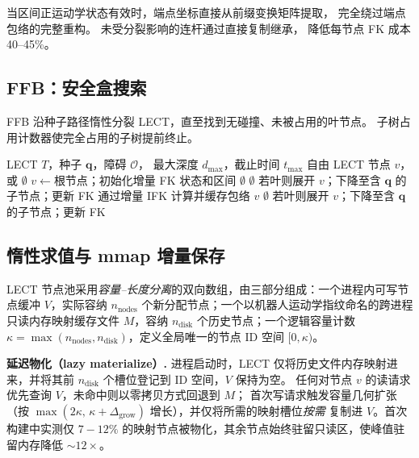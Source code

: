 \documentclass[journal]{IEEEtran}
\begin{document}
当区间正运动学状态有效时，端点坐标直接从前缀变换矩阵提取，
完全绕过端点包络的完整重构。
未受分裂影响的连杆通过直接复制继承，
降低每节点 FK 成本 40--45\%。

\subsection{FFB：安全盒搜索}

FFB 沿种子路径惰性分裂 LECT，直至找到无碰撞、未被占用的叶节点。
子树占用计数器使完全占用的子树提前终止。

\begin{algorithm}[t]
\caption{安全盒搜索（FFB）}\label{alg:ffb}
\footnotesize
\begin{algorithmic}[1]
\REQUIRE LECT $T$，种子 $\bm{q}$，障碍 $\mathcal{O}$，
  最大深度 $d_{\max}$，截止时间 $t_{\max}$
\ENSURE 自由 LECT 节点 $v$，或 $\emptyset$
\STATE $v \leftarrow \text{根节点}$；初始化增量 FK 状态和区间
\WHILE{\TRUE}
    \RETURN $\emptyset$
  \ENDIF
      \RETURN $\emptyset$
    \ENDIF
    \STATE 若叶则展开 $v$；下降至含 $\bm{q}$ 的子节点；更新 FK
  \ELSE
      \STATE 通过增量 IFK 计算并缓存包络
    \ENDIF
      \RETURN $v$ \hfill{}
    \ELSE
        \RETURN $\emptyset$
      \ENDIF
      \STATE 若叶则展开 $v$；下降至含 $\bm{q}$ 的子节点；更新 FK
    \ENDIF
  \ENDIF
\ENDWHILE
\end{algorithmic}
\end{algorithm}

\subsection{惰性求值与 mmap 增量保存}\label{sec:lect_lazy}

LECT 节点池采用\emph{容量--长度分离}的双向数组，由三部分组成：一个进程内可写节点缓冲 $V$，实际容纳 $n_\text{nodes}$ 个新分配节点；一个以机器人运动学指纹命名的跨进程只读内存映射缓存文件 $M$，容纳 $n_\text{disk}$ 个历史节点；一个逻辑容量计数 $\kappa = \max(n_\text{nodes},n_\text{disk})$，定义全局唯一的节点 ID 空间 $[0,\kappa)$。

\textbf{延迟物化（lazy materialize）.}
进程启动时，LECT 仅将历史文件内存映射进来，并将其前 $n_\text{disk}$ 个槽位登记到 ID 空间，$V$ 保持为空。
任何对节点 $v$ 的读请求优先查询 $V$，未命中则以零拷贝方式回退到 $M$；
首次写请求触发容量几何扩张（按 $\max(2\kappa,\,\kappa+\Delta_\text{grow})$ 增长），并仅将所需的映射槽位\emph{按需} 复制进 $V$。首次构建中实测仅 $7\!-\!12\%$ 的映射节点被物化，其余节点始终驻留只读区，使峰值驻留内存降低 $\sim\!12\times$。
\end{document}

